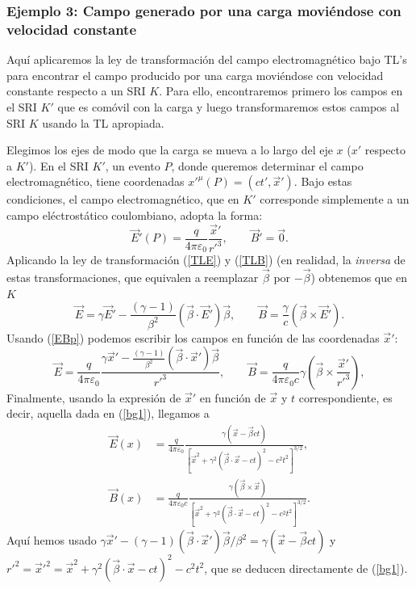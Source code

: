 \subsubsection{Ejemplo 3: Campo generado por una carga moviéndose con velocidad constante}\label{secEjEBvc}
Aquí aplicaremos la ley de transformación del campo electromagnético bajo
TL's para encontrar el campo producido por una carga moviéndose con velocidad constante respecto a un SRI $K$. Para ello, encontraremos primero los campos en el SRI $K'$ que es comóvil con la carga y luego transformaremos estos campos al SRI $K$ usando la TL apropiada.

Elegimos los ejes de modo que la carga se mueva a lo largo del eje $x$ ($x'$ respecto a $K'$). En el SRI $K'$, un evento $P$, donde queremos determinar el campo electromagnético, tiene coordenadas $x'^\mu(P)=(ct',\vec{x}')$. Bajo estas condiciones, el campo electromagnético, que en $K'$ corresponde simplemente a un campo eléctrostático coulombiano, adopta la forma:
\begin{equation}
\vec{E}'(P)=\frac{q}{4\pi\varepsilon_0}\frac{\vec{x}'}{r'^3}, \qquad \vec{B}' =\vec{0}. \label{EBp}
\end{equation}
Aplicando la ley de transformación (\ref{TLE}) y (\ref{TLB}) (en realidad, la
\textit{inversa} de estas transformaciones, que equivalen a reemplazar
$\vec{\beta}$ por $-\vec{\beta}$) obtenemos que en $K$
\begin{equation}
\vec{E}=\gamma \vec{E}'-\frac{(\gamma -1)}{\beta^2}\left( \vec{\beta}\cdot
\vec{E}'\right) \vec{\beta} , \qquad
\vec{B}=\frac{\gamma}{c} \left(\vec{\beta}\times\vec{E}'\right).
\end{equation}
Usando (\ref{EBp}) podemos escribir los campos en función de las coordenadas
$\vec{x}'$:
\begin{equation}
\vec{E}=\frac{q}{4\pi\varepsilon_0}\frac{\gamma \vec{x}'-\frac{(\gamma -1)}{\beta^2}(\vec{\beta}\cdot
\vec{x}')\vec{\beta}}{r'^3}  , \qquad
\vec{B}=\frac{q}{4\pi\varepsilon_0 c}\gamma \left(\vec{\beta}\times\frac{\vec{x}'}{r'^3}\right),
\end{equation}
Finalmente, usando la expresión de $\vec{x}'$ en función de $\vec{x}$ y $t$
correspondiente, es decir, aquella dada en (\ref{bg1}), llegamos a
\begin{align}
\vec{E}(x) &= \frac{q}{4\pi\varepsilon_0}\frac{\gamma\left( \vec{x}-\vec{\beta}ct\right)}
{\left[\vec{x}^2+\gamma^2\left(\vec{\beta}\cdot\vec{x}-ct\right)^2-c^2t^2\right]^{3/2}} , \\
\vec{B}(x) &= \frac{q}{4\pi\varepsilon_0c}\frac{\gamma\left( \vec{\beta}\times\vec{x}\right) }
{\left[\vec{x}^2+\gamma^2\left(\vec{\beta}\cdot\vec{x}-ct\right)^2-c^2t^2\right]^{3/2}}.
\end{align}
Aquí hemos usado $\gamma \vec{x}'-(\gamma -1)(\vec{\beta}\cdot\vec{x}')\vec{\beta}/\beta^2=\gamma\left( \vec{x}-\vec{\beta}ct\right) $ y
$r'^2=\vec{x}'^2=\vec{x}^2+\gamma^2\left(\vec{\beta}\cdot\vec{x}-ct\right)^2-c^2t^2$, que se deducen directamente de (\ref{bg1}).

